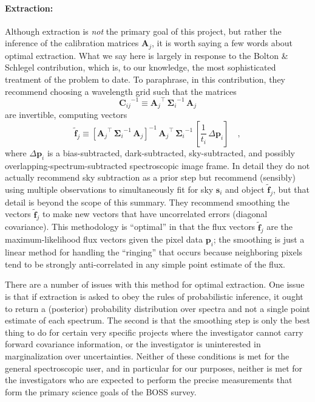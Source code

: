 \documentclass[12pt]{article}
\newcommand{\inverse}[1]{{#1}^{-1}}
\newcommand{\transpose}[1]{{#1}^{\scriptscriptstyle \top}}
\newcommand{\hmatrix}[1]{\boldsymbol{#1}}
\newcommand{\Amatrix}{\hmatrix{A}}
\newcommand{\pixels}{\hmatrix{p}}
\newcommand{\fluxLSF}{\hmatrix{\tilde{f}}}
\newcommand{\sky}{\hmatrix{s}}
\newcommand{\pixelvariance}{\hmatrix{\Sigma}}
\newcommand{\covariance}{\hmatrix{C}}
\begin{document}
\paragraph{Extraction:}
Although extraction is \emph{not} the primary goal of this project,
but rather the inference of the calibration matrices $\Amatrix_j$, it
is worth saying a few words about optimal extraction.  What we say
here is largely in response to the Bolton \& Schlegel contribution,
which is, to our knowledge, the most sophisticated treatment of the
problem to date.  To paraphrase, in this contribution, they recommend
choosing a wavelength grid such that the matrices
\begin{equation}
\inverse{\covariance_{ij}} \equiv
  \transpose{\Amatrix_j}\,\inverse{\pixelvariance_i}\,\Amatrix_j
\end{equation}
are invertible, computing vectors
\begin{equation}
\fluxLSF_j \equiv
  \inverse{[\transpose{\Amatrix_j}\,\inverse{\pixelvariance_i}\,\Amatrix_j]}
  \,\transpose{\Amatrix_j}\,\inverse{\pixelvariance_i}
  \,\left[\frac{1}{t_i}\,\Delta\pixels_i\right] \quad ,
\end{equation}
where $\Delta\pixels_i$ is a bias-subtracted, dark-subtracted,
sky-subtracted, and possibly overlapping-spectrum-subtracted
spectroscopic image frame.  In detail they do not actually recommend
sky subtraction as a prior step but recommend (sensibly) using
multiple observations to simultaneously fit for sky $\sky_i$ and
object $\fluxLSF_j$, but that detail is beyond the scope of this
summary.  They recommend smoothing the vectors $\fluxLSF_j$ to make
new vectors that have uncorrelated errors (diagonal covariance).  This
methodology is ``optimal'' in that the flux vectors $\fluxLSF_j$ are
the maximum-likelihood flux vectors given the pixel data $\pixels_i$;
the smoothing is just a linear method for handling the ``ringing''
that occurs because neighboring pixels tend to be strongly
anti-correlated in any simple point estimate of the flux.

There are a number of issues with this method for optimal extraction.
One issue is that if extraction is asked to obey the rules of
probabilistic inference, it ought to return a (posterior) probability
distribution over spectra and not a single point estimate of each
spectrum.  The second is that the smoothing step is only the best
thing to do for certain very specific projects where the investigator
cannot carry forward covariance information, or the investigator is
uninterested in marginalization over uncertainties.  Neither of these
conditions is met for the general spectroscopic user, and in
particular for our purposes, neither is met for the investigators who
are expected to perform the precise measurements that form the primary
science goals of the BOSS survey.
\end{document}
